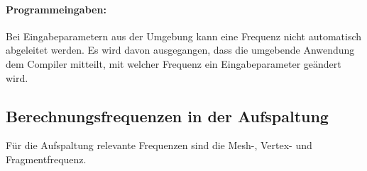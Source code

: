\documentclass[twoside,a4paper,fleqn,12pt]{book}
\begin{document}
\paragraph{Programmeingaben:}
Bei Eingabeparametern aus der Umgebung kann eine Frequenz nicht automatisch abgeleitet werden.
Es wird davon ausgegangen, dass die umgebende Anwendung dem Compiler mitteilt, mit welcher Frequenz ein Eingabeparameter
geändert wird.\\



\subsection{Berechnungsfrequenzen in der Aufspaltung}
\label{splitter_Berechnungsfrequenzen}

Für die Aufspaltung relevante Frequenzen sind die Mesh-, %
Vertex- und Fragmentfrequenz.
\end{document}

